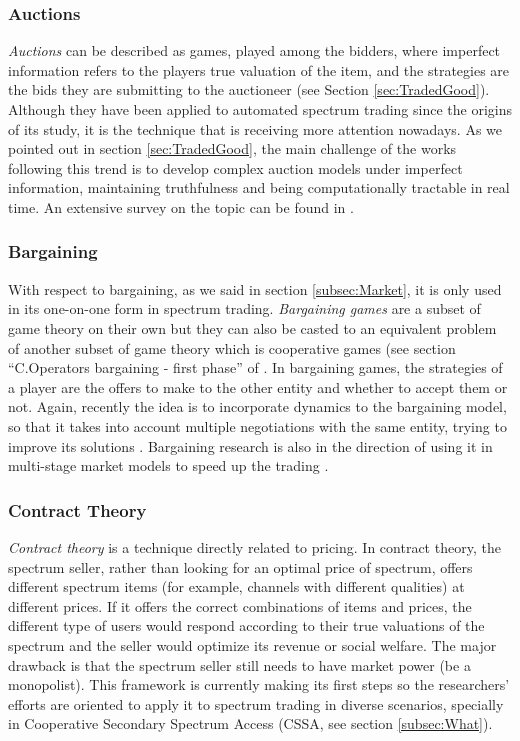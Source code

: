 \subsubsection{Auctions}
\textit{Auctions} can be described as games, played among the bidders, where imperfect information refers to the players true valuation of the item, and the strategies are the bids they are submitting to the auctioneer (see Section \ref{sec:TradedGood}). 
Although they have been applied to automated spectrum trading since the origins of its study, it is the technique that is receiving more attention nowadays. 
As we pointed out in section \ref{sec:TradedGood}, the main challenge of the works following this trend is to develop complex auction models under imperfect information, maintaining truthfulness and being computationally tractable in real time. 
An extensive survey on the topic can be found in \cite{ref:Zhang2012}.

\subsubsection{Bargaining}
With respect to bargaining, as we said in section \ref{subsec:Market}, it is only used in its one-on-one form in spectrum trading. 
\textit{Bargaining games} are a subset of game theory on their own but they can also be casted to an equivalent problem of another subset of game theory which is cooperative games (see section ``C.Operators bargaining - first phase'' of \cite{ref:Guijarro2011}. 
In bargaining games, the strategies of a player are the offers to make to the other entity and whether to accept them or not. 
Again, recently the idea is to incorporate dynamics to the bargaining model, so that it takes into account multiple negotiations with the same entity, trying to improve its solutions \cite{ref:Yan2011,ref:Yan2012}. Bargaining research is also in the direction of using it in multi-stage market models to speed up the trading \cite{ref:Guijarro2011,ref:Xu2012}. 

\subsubsection{Contract Theory}
\textit{Contract theory} is a technique directly related to pricing.
In contract theory, the spectrum seller, rather than looking for an optimal price of spectrum, offers different spectrum items (for example, channels with different qualities) at different prices. 
If it offers the correct combinations of items and prices, the different type of users would respond according to their true valuations of the spectrum and the seller would optimize its revenue or social welfare.
The major drawback is that the spectrum seller still needs to have market power (be a monopolist).
This framework is currently making its first steps so the researchers' efforts are oriented to apply it to spectrum trading in diverse scenarios, specially in Cooperative Secondary Spectrum Access (CSSA, see section \ref{subsec:What}).

